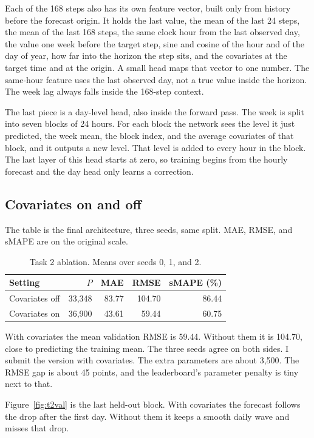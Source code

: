 \documentclass[11pt,a4paper]{article}
\begin{document}
Each of the 168 steps also has its own feature vector, built only from history before the forecast origin. It holds the last value, the mean of the last 24 steps, the mean of the last 168 steps, the same clock hour from the last observed day, the value one week before the target step, sine and cosine of the hour and of the day of year, how far into the horizon the step sits, and the covariates at the target time and at the origin. A small head maps that vector to one number. The same-hour feature uses the last observed day, not a true value inside the horizon. The week lag always falls inside the 168-step context.

The last piece is a day-level head, also inside the forward pass. The week is split into seven blocks of 24 hours. For each block the network sees the level it just predicted, the week mean, the block index, and the average covariates of that block, and it outputs a new level. That level is added to every hour in the block. The last layer of this head starts at zero, so training begins from the hourly forecast and the day head only learns a correction.

\subsection*{Covariates on and off}

The table is the final architecture, three seeds, same split. MAE, RMSE, and sMAPE are on the original scale.

\begin{table}[H]
\centering
\small
\begin{tabular}{lrrrr}
\toprule
Setting & $P$ & MAE & RMSE & sMAPE (\%) \\
\midrule
Covariates off & 33,348 & 83.77 & 104.70 & 86.44 \\
Covariates on & 36,900 & 43.61 & 59.44 & 60.75 \\
\bottomrule
\end{tabular}
\caption{Task 2 ablation. Means over seeds 0, 1, and 2.}
\end{table}

With covariates the mean validation RMSE is 59.44. Without them it is 104.70, close to predicting the training mean. The three seeds agree on both sides. I submit the version with covariates. The extra parameters are about 3,500. The RMSE gap is about 45 points, and the leaderboard's parameter penalty is tiny next to that.

Figure~\ref{fig:t2val} is the last held-out block. With covariates the forecast follows the drop after the first day. Without them it keeps a smooth daily wave and misses that drop.
\end{document}

